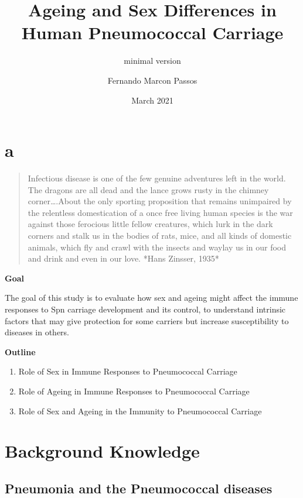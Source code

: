 \documentclass[
]{book}
\title{Ageing and Sex Differences in Human Pneumococcal Carriage}
\subtitle{minimal version}
\author{Fernando Marcon Passos}
\date{March 2021}
\begin{document}
\maketitle

{
\setcounter{tocdepth}{1}
\tableofcontents
}
\hypertarget{a}{%
\chapter*{a}\label{a}}

\begin{quote}
Infectious disease is one of the few genuine adventures left in the world. The dragons are all dead and the lance grows rusty in the chimney corner\ldots.About the only sporting proposition that remains unimpaired by the relentless domestication of a once free living human species is the war against those ferocious little fellow creatures, which lurk in the dark corners and stalk us in the bodies of rats, mice, and all kinds of domestic animals, which fly and crawl with the insects and waylay us in our food and drink and even in our love. *Hans Zinsser, 1935*
\end{quote}

\textbf{Goal}

The goal of this study is to evaluate how sex and ageing might affect the immune responses to Spn carriage development and its control, to understand intrinsic factors that may give protection for some carriers but increase susceptibility to diseases in others.

\textbf{Outline}

\begin{enumerate}
\def\labelenumi{\arabic{enumi}.}
\item
  Role of Sex in Immune Responses to Pneumococcal Carriage
\item
  Role of Ageing in Immune Responses to Pneumococcal Carriage
\item
  Role of Sex and Ageing in the Immunity to Pneumococcal Carriage
\end{enumerate}

\hypertarget{intro}{%
\chapter{Background Knowledge}\label{intro}}

\hypertarget{pneumonia-and-the-pneumococcal-diseases}{%
\section{Pneumonia and the Pneumococcal diseases}\label{pneumonia-and-the-pneumococcal-diseases}}
\end{document}
